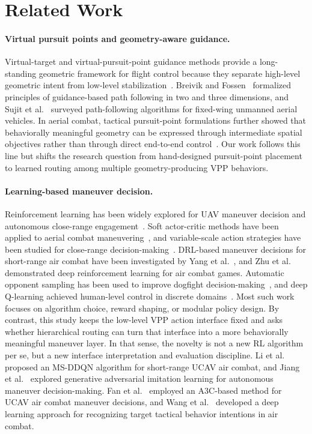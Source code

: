 \documentclass[5p,times]{elsarticle} %
\begin{document}
\section{Related Work}

\paragraph{Virtual pursuit points and geometry-aware guidance.}
Virtual-target and virtual-pursuit-point guidance methods provide a long-standing geometric framework for flight control because they separate high-level geometric intent from low-level stabilization~\cite{park2007,ratnoo2015}. Breivik and Fossen~\cite{breivik2005} formalized principles of guidance-based path following in two and three dimensions, and Sujit et al.~\cite{sujit2014} surveyed path-following algorithms for fixed-wing unmanned aerial vehicles. In aerial combat, tactical pursuit-point formulations further showed that behaviorally meaningful geometry can be expressed through intermediate spatial objectives rather than through direct end-to-end control~\cite{xu2022ast}. Our work follows this line but shifts the research question from hand-designed pursuit-point placement to learned routing among multiple geometry-producing VPP behaviors.

\paragraph{Learning-based maneuver decision.}
Reinforcement learning has been widely explored for UAV maneuver decision and autonomous close-range engagement~\cite{choi2023}. Soft actor-critic methods have been applied to aerial combat maneuvering~\cite{quan2026}, and variable-scale action strategies have been studied for close-range decision-making~\cite{wang2023aerospace}. DRL-based maneuver decisions for short-range air combat have been investigated by Yang et al.~\cite{yang2020access}, and Zhu et al.~\cite{zhu2024dt} demonstrated deep reinforcement learning for air combat games. Automatic opponent sampling has been used to improve dogfight decision-making~\cite{chen2025aerospace}, and deep Q-learning achieved human-level control in discrete domains~\cite{mnih2015}. Most such work focuses on algorithm choice, reward shaping, or modular policy design. By contrast, this study keeps the low-level VPP action interface fixed and asks whether hierarchical routing can turn that interface into a more behaviorally meaningful maneuver layer. In that sense, the novelty is not a new RL algorithm per se, but a new interface interpretation and evaluation discipline. Li et al.~\cite{li2022msddqn} proposed an MS-DDQN algorithm for short-range UCAV air combat, and Jiang et al.~\cite{jiang2025gail} explored generative adversarial imitation learning for autonomous maneuver decision-making. Fan et al.~\cite{fan2022a3c} employed an A3C-based method for UCAV air combat maneuver decisions, and Wang et al.~\cite{wang2024tactical} developed a deep learning approach for recognizing target tactical behavior intentions in air combat.
\end{document}
